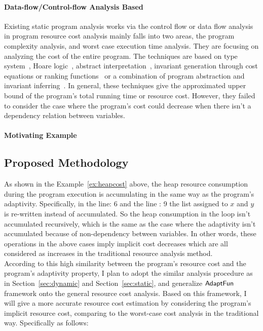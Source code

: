 \paragraph*{Data-flow/Control-flow Analysis Based}
Existing static program analysis works via the control flow or data flow analysis 
in program resource cost analysis 
mainly falls into two areas, the program complexity analysis, and worst case execution time analysis. 
They are focusing on analyzing the cost of the entire program. 
The techniques are based on
type system~\cite{CicekBG0H17, RajaniG0021}, Hoare logic~\cite{CarbonneauxHS15}, abstract interpretation~\cite{GustafssonEL05, HumenbergerJK18},
invariant generation through cost equations or ranking functions~\cite{BrockschmidtEFFG16,AlbertAGP08,AliasDFG10,Flores-MontoyaH14}
or a combination of program abstraction and invariant inferring~\cite{GulwaniZ10, SinnZV17, GulwaniJK09}.
In general, these techniques give the approximated upper bound of the program's total running time or resource cost.
However, they failed to consider the case where the program's cost could decrease when there isn't a dependency relation between variables.

\paragraph{Motivating Example}
\label{subsubsec:furthers-cost-example}

\subsection{Proposed Methodology}
\label{subsubsec:furthers-cost-methodology}
As shown in the Example~\ref{ex:heapcost} above, the heap resource consumption during the program 
execution is accumulating in the same way as the program's adaptivity. 
Specifically, in the line: 6 and the line : 9
the list assigned to $x$ and $y$ is re-written instead of accumulated.
So the heap consumption in the loop isn't accumulated recursively, which is 
the same as the case where the adaptivity isn't accumulated because of non-dependency between variables.
In other words, these operations in the above cases imply implicit cost decreases 
which are all considered as increases in the traditional resource analysis 
method.
\\
According to this high similarity between the program's resource cost and the 
program's adaptivity property, I plan to adopt the similar analysis procedure as in Section~\ref{sec:dynamic} and 
Section~\ref{sec:static},
and generalize 
$\textsf{AdaptFun}$ framework onto the general resource cost analysis. 
Based on this framework,
I will give
a more accurate resource cost estimation by considering the program's implicit resource cost, comparing 
to the worst-case cost analysis in the traditional way. Specifically as follows:
